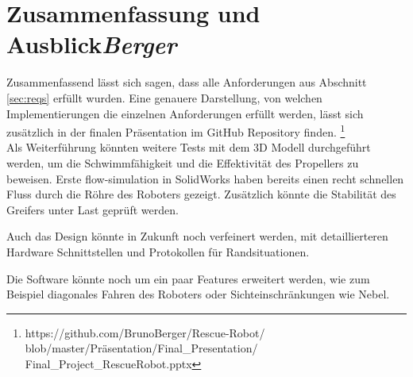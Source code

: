 \section{Zusammenfassung und Ausblick\hfill\textnormal{\emph{Berger}}}
Zusammenfassend lässt sich sagen, dass alle Anforderungen aus Abschnitt \ref{sec:reqs} erfüllt wurden.
Eine genauere Darstellung, von welchen Implementierungen die einzelnen Anforderungen erfüllt werden,
lässt sich zusätzlich in der finalen Präsentation im GitHub Repository finden.
\footnote{https://github.com/BrunoBerger/Rescue-Robot/\linebreak
    blob/master/Präsentation/Final\_Presentation/\linebreak
    Final\_Project\_RescueRobot.pptx}
\\  

Als Weiterführung könnten weitere Tests mit dem 3D Modell durchgeführt werden,
um die Schwimmfähigkeit und die Effektivität des Propellers zu beweisen.
Erste flow-simulation in SolidWorks haben bereits einen recht schnellen Fluss
durch die Röhre des Roboters gezeigt.
Zusätzlich könnte die Stabilität des Greifers unter Last geprüft werden.

Auch das Design könnte in Zukunft noch verfeinert werden,
mit detaillierteren Hardware Schnittstellen 
und Protokollen für Randsituationen.

Die Software könnte noch um ein paar Features erweitert werden,
wie zum Beispiel diagonales Fahren des Roboters 
oder Sichteinschränkungen wie Nebel.

    
